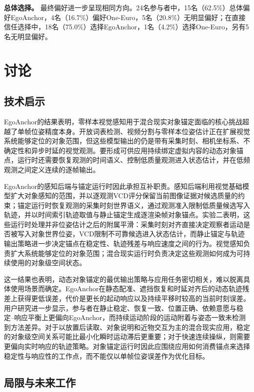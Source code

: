 \documentclass[review]{vgtc}
\begin{document}
\textbf{总体选择。}
最终偏好进一步呈现相同方向。24名参与者中，15名（62.5\%）总体偏好EgoAnchor，4名（16.7\%）偏好One-Euro，5名（20.8\%）无明显偏好；在直接信任选择中，18名（75.0\%）选择EgoAnchor，1名（4.2\%）选择One-Euro，另有5名无明显偏好。

\section{讨论}\label{sec:discussion}

\subsection{技术启示}

EgoAnchor的结果表明，零样本视觉感知用于混合现实对象锚定面临的核心挑战超越了单帧位姿精度本身。开放词表检测、视频分割与零样本位姿估计正在扩展视觉系统能够定位的对象范围，但这些模型输出的仍是带有采集时刻、相机坐标系、不确定性和异步时延的视觉观测。要形成可供应用持续绑定虚拟内容的动态对象锚点，运行时还需要恢复观测的时间语义、控制低质量观测进入状态估计，并在低频观测之间定义连续的逐帧输出。

EgoAnchor的感知后端与锚定运行时因此承担互补职责。感知后端利用视觉基础模型扩大对象感知的范围，并以逐观测VCD评分保留当前图像证据对候选质量的约束；锚定运行时恢复观测的采集时刻世界语义，通过观测准入限制低质量候选写入轨迹，并以时间索引轨迹取值与静止锚定生成逐渲染帧对象锚点。实验二表明，这些运行时处理并非位姿估计之后的附属平滑：采集时刻对齐直接决定观察者运动是否被写入对象世界位姿，VCD限制不可靠候选进入状态估计，而静止锚定与轨迹输出策略进一步决定锚点在稳定性、轨迹残差与响应速度之间的行为。视觉感知负责扩大系统能够定位的对象范围；混合现实运行时负责决定这些观测如何成为可持续使用的对象级空间状态。

这一结果也表明，动态对象锚定的最优输出策略与应用任务密切相关，难以脱离具体使用场景而确定。EgoAnchor在静态配准、遮挡恢复和时延对齐后的动态轨迹残差上获得更低误差，代价是更长的起动响应以及持续平移时较高的当前时刻误差。用户研究进一步显示，参与者在静止稳定、恢复一致、位置正确、依赖意愿与稳定--响应平衡上更偏向EgoAnchor，而持续运动阶段的运动附着与姿态一致未检测到方法差异。对于以放置后读取、对象说明和近物交互为主的混合现实应用，稳定的对象级空间关系可能比最小化瞬时运动滞后更重要；对于快速连续操纵，则需要更偏向实时响应的轨迹策略。对象锚定运行时因此应围绕应用如何消费锚点来选择稳定性与响应性的工作点，而不能仅以单帧位姿误差作为优化目标。

\subsection{局限与未来工作}
\end{document}

